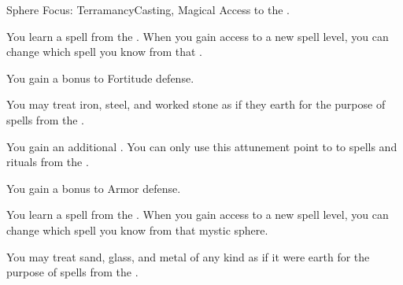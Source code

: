     \begin{feat}{Sphere Focus: Terramancy}{Casting, Magical}
        \featpre Access to the  .

         You learn a spell from the  .
        When you gain access to a new spell level, you can change which spell you know from that .

         You gain a  bonus to Fortitude defense.

         You may treat iron, steel, and worked stone as if they earth for the purpose of spells from the  .

         You gain an additional .
        You can only use this attunement point to  to spells and rituals from the  .

         You gain a  bonus to Armor defense.

         You learn a spell from the  .
        When you gain access to a new spell level, you can change which spell you know from that mystic sphere.

         You may treat sand, glass, and metal of any kind as if it were earth for the purpose of spells from the  .
    \end{feat}


